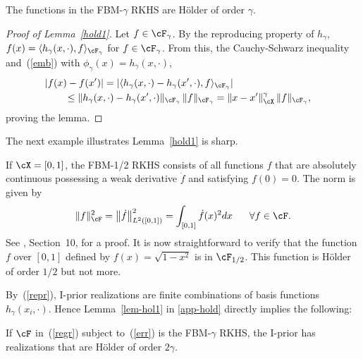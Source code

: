 \documentclass[preprint,12pt,authoryear]{elsarticle}
\DeclarePairedDelimiter{\abs}{\lvert}{\rvert}
\DeclarePairedDelimiter{\norm}{\lVert}{\rVert}
\newcommand{\LL}{L} %
\begin{document}
\begin{lemma}\label{hold1}
	The functions in the FBM-$\gamma$ RKHS are H\"older of order $\gamma$. 
\end{lemma}
\begin{proof}[Proof of Lemma~\ref{hold1}]
	Let $f\in\cF_\gamma$. By the reproducing property of $h_\gamma$, $f(x)=\langle h_\gamma(x,\cdot),f\rangle_{\cF_\gamma}$ for $f\in\cF_\gamma$. From this, the Cauchy-Schwarz inequality and~(\ref{emb}) with $\phi_\gamma(x)=h_\gamma(x,\cdot)$,
	\begin{equation}\label{holdproof}
	\begin{split}
	\lefteqn{\abs{f(x)-f(x')}
		= \abs{\langle h_\gamma(x,\cdot)-h_\gamma(x',\cdot),f\rangle_{\cF_\gamma}}} \\
	&\quad\quad\le \norm{h_\gamma(x,\cdot)-h_\gamma(x',\cdot)}_{\cF_\gamma} \,\norm{f}_{\cF_\gamma} = \norm{x-x'}_\cX^\gamma\,\norm{f}_{\cF_\gamma},
	\end{split}
	\end{equation}
	proving the lemma.
\end{proof}

The next example illustrates Lemma~\ref{hold1} is sharp.
\begin{example}\label{bm}\rm
	If $\cX=[0,1]$, the FBM-1/2 RKHS consists of all functions $f$ that are absolutely continuous possessing a weak derivative $\dot f$ and satisfying $f(0)=0$. The norm is given by
	\begin{eqnarray*}%
		\norm{f}_\cF^2 = \norm[\big]{\dot f}_{\LL^2([0,1])}^2 = \int_{[0,1]} \dot f(x)^2dx \hspace{6mm}\forall f\in\cF.
	\end{eqnarray*}
	See \citet{vz08rep}, Section~10, for a proof.
	It is now straightforward to verify that the function $f$ over $[0,1]$ defined by $f(x)=\sqrt{1-x^2}$ is in $\cF_{1/2}$. This function is H\"older of order $1/2$ but not more.
\end{example}



By~(\ref{repr}), I-prior realizations are finite combinations of basis functions $h_\gamma(x_i,\cdot)$. Hence Lemma~\ref{lem-hol1} in \ref{app-hold} directly implies the following:
\begin{lemma}
	If $\cF$ in~(\ref{regr}) subject to~(\ref{err}) is the FBM-$\gamma$ RKHS, the I-prior has realizations that are H\"older of order $2\gamma$. 
\end{lemma}
\end{document}
